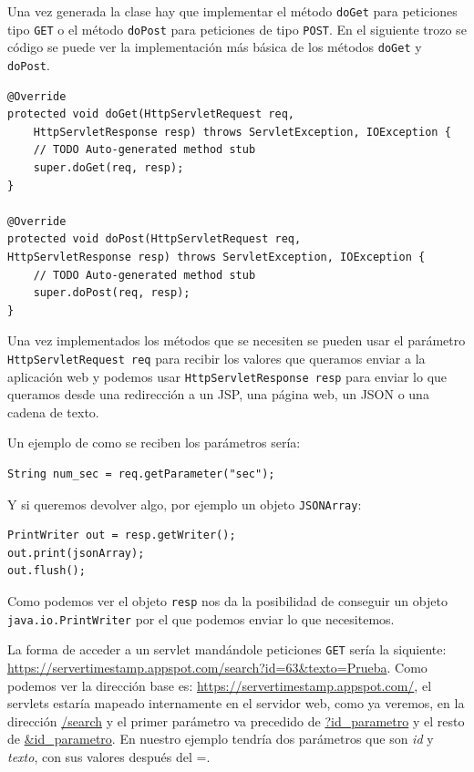 Una vez generada la clase hay que implementar el método \lstinline{doGet} para peticiones tipo \lstinline{GET} o el método \lstinline{doPost} para peticiones de tipo \lstinline{POST}. En el siguiente trozo se código se puede ver la implementación más básica de los métodos \lstinline{doGet} y \lstinline{doPost}.

\begin{lstlisting}[style=Java] 
@Override
protected void doGet(HttpServletRequest req, 
	HttpServletResponse resp) throws ServletException, IOException {
	// TODO Auto-generated method stub
	super.doGet(req, resp);
}

@Override
protected void doPost(HttpServletRequest req, 
HttpServletResponse resp) throws ServletException, IOException {
	// TODO Auto-generated method stub
	super.doPost(req, resp);
}
\end{lstlisting}

Una vez implementados los métodos que se necesiten se pueden usar el parámetro \lstinline{HttpServletRequest req} para recibir los valores que queramos enviar a la aplicación web y podemos usar \lstinline{HttpServletResponse resp} para enviar lo que queramos desde una redirección a un JSP, una página web, un JSON o una cadena de texto. 

Un ejemplo de como se reciben los parámetros sería: 

\begin{lstlisting}[style=Java]  
String num_sec = req.getParameter("sec");
\end{lstlisting}

Y si queremos devolver algo, por ejemplo un objeto \lstinline{JSONArray}:

\begin{lstlisting}[style=Java]   
PrintWriter out = resp.getWriter();
out.print(jsonArray);
out.flush();
\end{lstlisting}

Como podemos ver el objeto \lstinline{resp} nos da la posibilidad de conseguir un objeto \lstinline{java.io.PrintWriter} por el que podemos enviar lo que necesitemos.

La forma de acceder a un servlet mandándole peticiones \lstinline{GET} sería la siquiente: \url{https://servertimestamp.appspot.com/search?id=63&texto=Prueba}. Como podemos ver la dirección base es: \url{https://servertimestamp.appspot.com/}, el servlets estaría mapeado internamente en el servidor web, como ya veremos, en la dirección \url{/search} y el primer parámetro va precedido de \url{?id\_parametro} y el resto de \url{\&id\_parametro}. En nuestro ejemplo tendría dos parámetros que son \textit{id} y \textit{texto}, con sus valores después del =.

